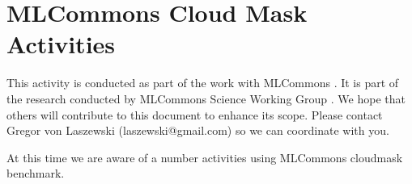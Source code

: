 \documentclass[sigplan,screen]{acmart}
\begin{document}

\maketitle


\section{MLCommons Cloud Mask Activities}

This activity is conducted as part of the work with MLCommons \cite{Farrell2021MLPerfHA}. 
It is part of the research conducted by MLCommons Science Working Group \cite{www-mlcommons-science-github}. 
We hope that others will contribute to this 
document to enhance its scope. Please contact Gregor von Laszewski (laszewski@gmail.com) 
so we can coordinate with you.

At this time we are aware of a number activities using MLCommons cloudmask benchmark.
\end{document}
